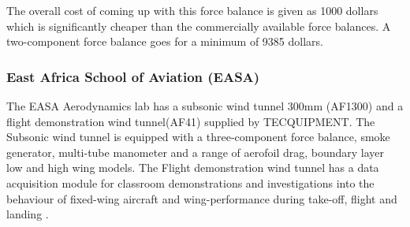 The overall cost of coming up with this force balance is given as 1000 dollars which is significantly cheaper than the commercially available force balances. A two-component force balance goes for a minimum of 9385 dollars.
\subsubsection{East Africa School of Aviation (EASA)}
The EASA Aerodynamics lab has a subsonic wind tunnel 300mm (AF1300) and a flight demonstration wind tunnel(AF41) supplied by TECQUIPMENT. The Subsonic wind tunnel is equipped with a three-component force balance, smoke generator, multi-tube manometer and a range of aerofoil drag, boundary layer low and high wing models. The Flight demonstration wind tunnel has a data acquisition module for classroom demonstrations and investigations into the behaviour of fixed-wing aircraft and wing-performance during take-off, flight and landing \cite{TEC}.


